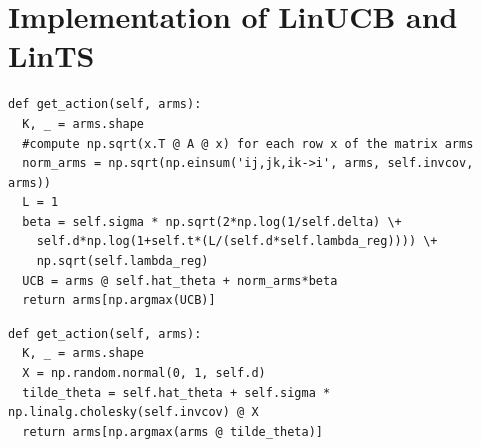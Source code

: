 \section{Implementation of LinUCB and LinTS}

\begin{verbatim}
def get_action(self, arms):
  K, _ = arms.shape
  #compute np.sqrt(x.T @ A @ x) for each row x of the matrix arms
  norm_arms = np.sqrt(np.einsum('ij,jk,ik->i', arms, self.invcov, arms))
  L = 1
  beta = self.sigma * np.sqrt(2*np.log(1/self.delta) \+ 
    self.d*np.log(1+self.t*(L/(self.d*self.lambda_reg)))) \+
    np.sqrt(self.lambda_reg)
  UCB = arms @ self.hat_theta + norm_arms*beta
  return arms[np.argmax(UCB)]
\end{verbatim}
\begin{verbatim}
def get_action(self, arms):
  K, _ = arms.shape
  X = np.random.normal(0, 1, self.d)
  tilde_theta = self.hat_theta + self.sigma * np.linalg.cholesky(self.invcov) @ X
  return arms[np.argmax(arms @ tilde_theta)]
\end{verbatim}


